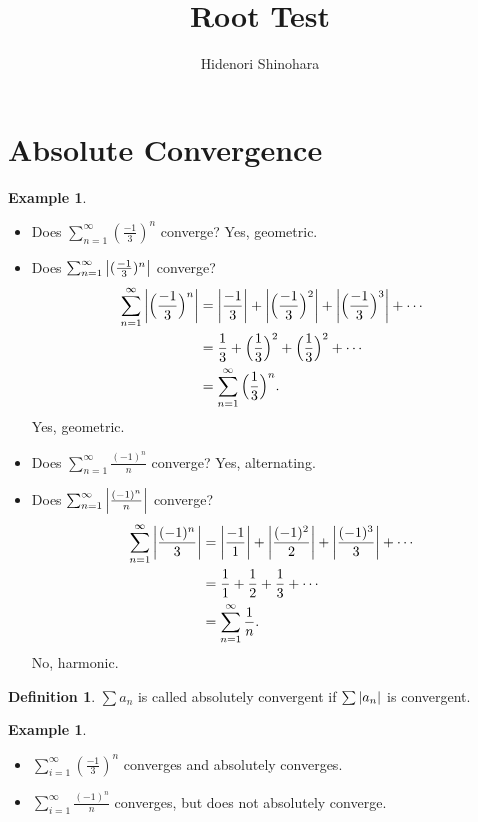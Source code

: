 \documentclass[12pt, psamsfonts]{amsart}
\theoremstyle{definition}
\newtheorem{defn}[thm]{Definition}
\newtheorem{exmp}[thm]{Example}
\theoremstyle{remark}
\numberwithin{equation}{section}
\begin{document}
\title{Root Test}
\author{Hidenori Shinohara}
\maketitle

\section{Absolute Convergence}

\begin{exmp}
$ $
  \begin{itemize}
    \item
      Does $\sum_{n=1}^{\infty} (\frac{-1}{3})^n$ converge?
      Yes, geometric.
    \item
      Does $\sum_{n=1}^{\infty} \abs{(\frac{-1}{3})^n}$ converge?
      \begin{align*}
        \sum_{n=1}^{\infty} \abs{\Big(\frac{-1}{3}\Big)^n}
          &= \abs{\frac{-1}{3}} + \abs{\Big(\frac{-1}{3}\Big)^2} + \abs{\Big(\frac{-1}{3}\Big)^3} + \cdots \\
          &= \frac{1}{3} + \Big(\frac{1}{3}\Big)^2 + \Big(\frac{1}{3}\Big)^2 + \cdots \\
          &= \sum_{n=1}^{\infty} \Big(\frac{1}{3}\Big)^n.
      \end{align*}
      Yes, geometric.
    \item
      Does $\sum_{n=1}^{\infty} \frac{(-1)^n}{n}$ converge?
      Yes, alternating.
    \item
      Does $\sum_{n=1}^{\infty} \abs{\frac{(-1)^n}{n}}$ converge?
      \begin{align*}
        \sum_{n=1}^{\infty} \abs{\frac{(-1)^n}{3}}
          &= \abs{\frac{-1}{1}} + \abs{\frac{(-1)^2}{2}} + \abs{\frac{(-1)^3}{3}} + \cdots \\
          &= \frac{1}{1} + \frac{1}{2} + \frac{1}{3} + \cdots \\
          &= \sum_{n=1}^{\infty} \frac{1}{n}.
      \end{align*}
      No, harmonic.
  \end{itemize}
\end{exmp}

\begin{defn}
  $\sum a_n$ is called absolutely convergent if $\sum \abs{a_n}$ is convergent.
\end{defn}

\begin{exmp}
$ $
  \begin{itemize}
    \item
      $\sum_{i=1}^{\infty} (\frac{-1}{3})^n$ converges and absolutely converges.
    \item
      $\sum_{i=1}^{\infty} \frac{(-1)^n}{n}$ converges, but does not absolutely converge.
  \end{itemize}
\end{exmp}
\end{document}
